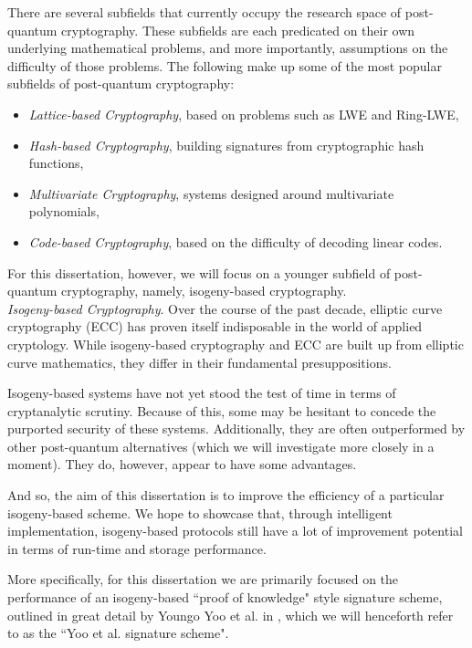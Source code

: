 There are several subfields that currently occupy the research space of post-quantum cryptography. These subfields are each predicated on their own underlying mathematical problems, and more importantly, assumptions on the difficulty of those problems. The following make up some of the most popular subfields of post-quantum cryptography: 
\begin{itemize}
\item \textit{Lattice-based Cryptography}, based on problems such as LWE and Ring-LWE, 
\item \textit{Hash-based Cryptography}, building signatures from cryptographic hash functions, 
\item \textit{Multivariate Cryptography}, systems designed around multivariate polynomials, 
\item \textit{Code-based Cryptography}, based on the difficulty of decoding linear codes.
\end{itemize}

For this dissertation, however, we will focus on a younger subfield of post-quantum cryptography, namely, isogeny-based cryptography.\\

\noindent
\textit{Isogeny-based Cryptography}. Over the course of the past decade, elliptic curve cryptography (ECC) has proven itself indisposable in the world of applied cryptology. While isogeny-based cryptography and ECC are built up from elliptic curve mathematics, they differ in their fundamental presuppositions.

Isogeny-based systems have not yet stood the test of time in terms of cryptanalytic scrutiny. Because of this, some may be hesitant to concede the purported security of these systems. Additionally, they are often outperformed by other post-quantum alternatives (which we will investigate more closely in a moment). They do, however, appear to have some advantages. 

And so, the aim of this dissertation is to improve the efficiency of a particular isogeny-based scheme. We hope to showcase that, through intelligent implementation, isogeny-based protocols still have a lot of improvement potential in terms of run-time and storage performance.

More specifically, for this dissertation we are primarily focused on the performance of an isogeny-based ``proof of knowledge" style signature scheme, outlined in great detail by Youngo Yoo et al. in \cite{yoo}, which we will henceforth refer to as the ``Yoo et al. signature scheme".

